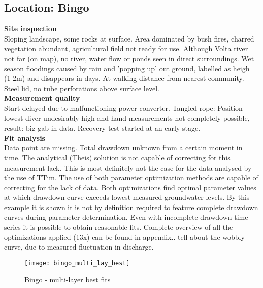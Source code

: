 \subsection{Location: Bingo}

\textbf{Site inspection}\\
Sloping landscape, some rocks at surface. Area dominated by bush fires, charred vegetation abundant, agricultural field not ready for use. Although Volta river not far (on map), no river, water flow or ponds seen in direct surroundings. Wet season floodings caused by rain and ’popping up’ out ground, labelled as heigh (1-2m) and disappears in days. At walking distance from nearest community. Steel lid, no tube perforations above surface level. \\

\textbf{Measurement quality}\\
Start delayed due to malfunctioning power converter. Tangled rope: Position lowest diver undesirably high and hand measurements not completely possible, result: big gab in data. Recovery test started at an early stage. \\

\textbf{Fit analysis} \\
Data point are missing. Total drawdown unknown from a certain moment in time. The analytical (Theis) solution is not capable of correcting for this measurement lack. This is most definitely not the case for the data analysed by the use of TTim. The use of both parameter optimization methods are capable of correcting for the lack of data. Both optimizations find optimal parameter values at which drawdown curve exceeds lowest measured groundwater levels. By this example it is shown it is not by definition required to feature complete drawdown curves during parameter determination. Even with incomplete drawdown time series it is possible to obtain reasonable fits. Complete overview of all the optimizations applied (13x) can be found in appendix.. tell about the wobbly curve, due to measured fluctuation in discharge. \\

\begin{figure}[h!]
 \centering
 \texttt{[image: bingo\_multi\_lay\_best]}
 \captionsetup{justification=centering} 
 \caption{Bingo - multi-layer best fits}
 \label{fig:Bingo_best}
\end{figure}

